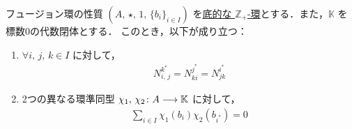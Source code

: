 \documentclass[TQFT_main]{subfiles}
\begin{document}
\begin{mylem}[label=lem:basedring]{フュージョン環の性質}
    $(A,\, \star,\, 1,\, \{b_i\}_{i \in I})$ を\hyperref[def:Z+ring]{底的な $\mathbb{Z}_+$-環}とする．また，$\mathbb{K}$ を標数0の代数閉体とする．
    このとき，以下が成り立つ：
    \begin{enumerate}
        \item $\forall i,\, j,\, k \in I$ に対して，
        \begin{align}
            N^{k^*}_{i,\, j} = N^{j^*}_{ki} = N^{i^*}_{jk}
        \end{align}
        \item 2つの異なる環準同型 $\chi_1,\, \chi_2 \colon A \longrightarrow \mathbb{K}$ に対して，
        \begin{align}
            \sum_{i \in I} \chi_1 (b_i) \chi_2 (b_{i^*}) = 0
        \end{align}
    \end{enumerate}
\end{mylem}
\end{document}
